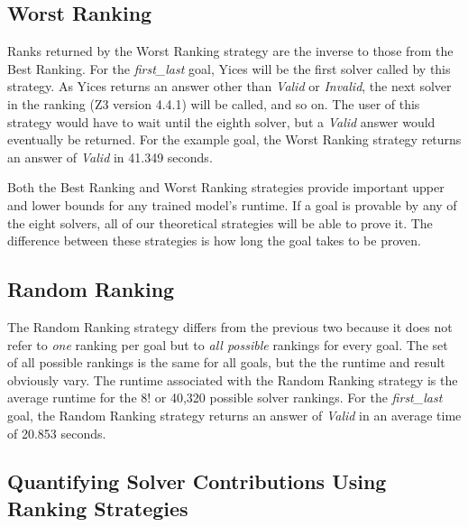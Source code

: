 \subsection{\textsf{Worst Ranking}}
\label{sub:worst}

Ranks returned by the \textsf{Worst Ranking} strategy are the inverse to those from the \textsf{Best Ranking}. 
For the \textit{first\_last} goal, Yices will be the first solver called by this strategy.
As Yices returns an answer other than \textit{Valid} or \textit{Invalid}, the next solver in the ranking (Z3 version 4.4.1) will be called, and so on.
The user of this strategy would have to wait until the eighth solver, but a \textit{Valid} answer would eventually be returned.
For the example goal, the \textsf{Worst Ranking} strategy returns an answer of \textit{Valid} in 41.349 seconds.

Both the \textsf{Best Ranking} and \textsf{Worst Ranking} strategies provide important upper and lower bounds for any trained model's runtime.
If a goal is provable by any of the eight solvers, all of our theoretical strategies will be able to prove it.
The difference between these strategies is how long the goal takes to be proven.  

\subsection{\textsf{Random Ranking}}

The \textsf{Random Ranking} strategy differs from the previous two because it does not refer to \textit{one} ranking per goal but to \textit{all possible} rankings for every goal.
The set of all possible rankings is the same for all goals, but the the runtime and result obviously vary. 
The runtime associated with the \textsf{Random Ranking} strategy is the average runtime for the 8! or 40,320 possible solver rankings.
For the \textit{first\_last} goal, the \textsf{Random Ranking} strategy returns an answer of \textit{Valid} in an average time of 20.853 seconds.

\subsection{Quantifying Solver Contributions Using Ranking Strategies}

